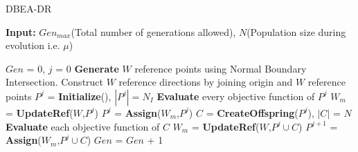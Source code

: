\documentclass{sig-alternate}
\begin{document}
\begin{algorithm}[!ht]\footnotesize
   \caption{DBEA-DR}
   \textbf{Input:} $Gen_{max}$\hspace{1mm}(Total number of generations allowed), $N$\hspace{1mm}(Population size during evolution i.e. $\mu$)
   \begin{algorithmic}[1]
   	\STATE $Gen$ = 0, $j$ = 0
   	\STATE \textbf{Generate} $W$ reference points using Normal Boundary Intersection.
   	\STATE Construct $W$ reference directions by joining origin and $W$ reference points
   	\STATE $P^j$ = \textbf{Initialize}(), $\left|P^j\right| = N_I$ 
   	\STATE \textbf{Evaluate} every objective function of $P^j$
   	\STATE $W_m$ = \textbf{UpdateRef}($W$,$P^j$)
   	\STATE $P^j$ = \textbf{Assign}($W_m$,$P^j$) 	
   	\STATE $C$ = \textbf{CreateOffspring}($P^j$), $\left|C\right|$ = $N$
   	\STATE \textbf{Evaluate} each objective function of $C$
   	\STATE $W_m$ = \textbf{UpdateRef}($W$,$P^j \cup C$)
   	\STATE $P^{j+1}$ = \textbf{Assign}($W_m$,$P^j \cup C$)   
   	\STATE $Gen$ = $Gen$ + 1
   	\ENDWHILE		
  
	\end{algorithmic}
   \label{alg:ADBEA}
\end{algorithm} 
\end{document}
